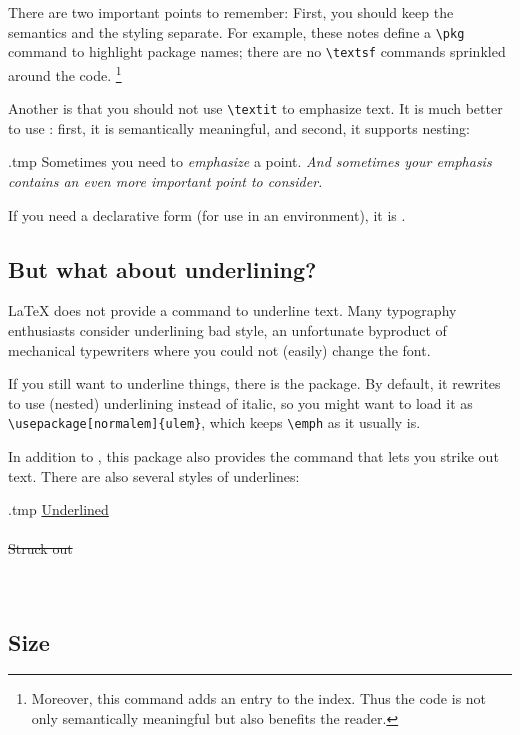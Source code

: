 There are two important points to remember:
First, you should keep the semantics and the styling separate.
For example, these notes define a \verb|\pkg| command to highlight package names;
there are no \verb|\textsf| commands sprinkled around the code.%
\footnote{Moreover, this command adds an entry to the index.
Thus the code is not only semantically meaningful but also benefits the reader.}

Another is that you should not use \verb|\textit| to emphasize text.
It is much better to use :
first, it is semantically meaningful, and second, it supports nesting:%
\begin{VerbatimOut}{\jobname.tmp}
Sometimes you need to
\emph{emphasize} a point.
\emph{And sometimes your emphasis
contains \emph{an even more important}
point to consider.}
\end{VerbatimOut}
\ShowExample
%
If you need a declarative form (for use in an environment), it is .


\subsection{But what about underlining?}

\LaTeX{} does not provide a command to underline text.
Many typography enthusiasts consider underlining bad style,
an unfortunate byproduct of mechanical typewriters where you could not (easily) change the font.

If you still want to underline things, there is the  package.
By default, it rewrites  to use (nested) underlining instead of italic,
so you might want to load it as \verb|\usepackage[normalem]{ulem}|,
which keeps \verb|\emph| as it usually is.

In addition to , this package also provides the  command
that lets you strike out text.
There are also several styles of underlines:
%
\begin{VerbatimOut}{\jobname.tmp}
\uline{Underlined}\\
\\
\sout{Struck out}\\
\\
\\
\end{VerbatimOut}
\ShowExample


%
%
\subsection{Size}

